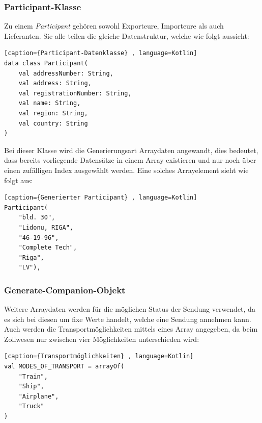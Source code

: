 \subsubsection{Participant-Klasse }
Zu einem \textit{Participant} gehören sowohl Exporteure, Importeure als auch Lieferanten. Sie alle teilen die gleiche Datenstruktur, welche wie folgt aussieht:
\begin{lstlisting}[caption={Participant-Datenklasse} , language=Kotlin]
data class Participant(
    val addressNumber: String,
    val address: String,
    val registrationNumber: String,
    val name: String,
    val region: String,
    val country: String
)
\end{lstlisting}
\vspace{4mm}\par
Bei dieser Klasse wird die Generierungsart Arraydaten angewandt, dies bedeutet, dass bereits vorliegende Datensätze in einem Array existieren und nur noch über einen zufälligen Index ausgewählt werden. Eine solches Arrayelement sieht wie folgt aus:
\begin{lstlisting}[caption={Generierter Participant} , language=Kotlin]
Participant(
    "bld. 30",
    "Lidonu, RIGA",
    "46-19-96",
    "Complete Tech",
    "Riga",
    "LV"),
\end{lstlisting}
\vspace{4mm}\par
\subsubsection{Generate-Companion-Objekt}
Weitere Arraydaten werden für die möglichen Status der Sendung verwendet, da es sich bei diesen um fixe Werte handelt, welche eine Sendung annehmen kann. Auch werden die Transportmöglichkeiten mittels eines Array angegeben, da beim Zollwesen nur zwischen vier Möglichkeiten unterschieden wird: 
\begin{lstlisting}[caption={Transportmöglichkeiten} , language=Kotlin]
val MODES_OF_TRANSPORT = arrayOf(
    "Train",
    "Ship",
    "Airplane",
    "Truck"
)
\end{lstlisting}
\vspace{4mm}\par
